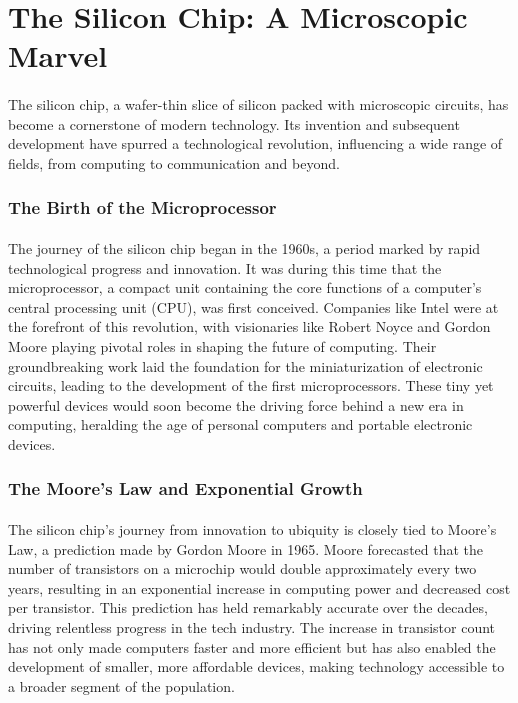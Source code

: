 \documentclass[a4paper,12pt]{book}
\begin{document}
\section*{The Silicon Chip: A Microscopic Marvel}
\paragraph{}
The silicon chip, a wafer-thin slice of silicon packed with microscopic circuits, has become a cornerstone of modern technology. Its invention and subsequent development have spurred a technological revolution, influencing a wide range of fields, from computing to communication and beyond.

\subsubsection*{The Birth of the Microprocessor}
\paragraph{}
The journey of the silicon chip began in the 1960s, a period marked by rapid technological progress and innovation. It was during this time that the microprocessor, a compact unit containing the core functions of a computer's central processing unit (CPU), was first conceived. Companies like Intel were at the forefront of this revolution, with visionaries like Robert Noyce and Gordon Moore playing pivotal roles in shaping the future of computing. Their groundbreaking work laid the foundation for the miniaturization of electronic circuits, leading to the development of the first microprocessors. These tiny yet powerful devices would soon become the driving force behind a new era in computing, heralding the age of personal computers and portable electronic devices.

\subsubsection*{The Moore's Law and Exponential Growth}
\paragraph{}
The silicon chip's journey from innovation to ubiquity is closely tied to Moore's Law, a prediction made by Gordon Moore in 1965. Moore forecasted that the number of transistors on a microchip would double approximately every two years, resulting in an exponential increase in computing power and decreased cost per transistor. This prediction has held remarkably accurate over the decades, driving relentless progress in the tech industry. The increase in transistor count has not only made computers faster and more efficient but has also enabled the development of smaller, more affordable devices, making technology accessible to a broader segment of the population.
\end{document}
